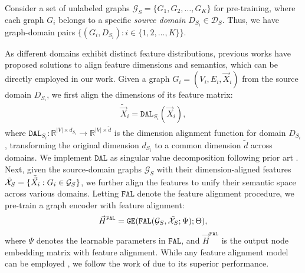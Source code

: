 \label{sec.pre.multi-domain}
Consider a set of unlabeled graphs \( \mathcal{G}_S = \{ G_1, G_2, \ldots, G_K \} \) for pre-training, where each graph \( G_i \) belongs to a specific \emph{source domain} \( D_{S_i} \in \mathcal{D}_S \). 
Thus, we have graph-domain pairs \( \{(G_i, D_{S_i}): i \in \{ 1, 2, \ldots, K\}\} \). 

As different domains exhibit distinct feature distributions, previous works \cite{zhao2024all,yu2024text} have proposed solutions to align feature dimensions and semantics, which can be directly employed in our work. 
Given a graph \( G_{i} = (V_{i}, E_{i}, \vec{X}_{i}) \) from the source domain \( D_{S_i} \), we first align the dimensions of its feature matrix:
\begin{align}\label{eq.pre-train.dim-align}
    \tilde{\Vec{X}}_{i} = \mathtt{DAL}_{S_i}(\Vec{X}_{i}),
\end{align}
where \( \mathtt{DAL}_{S_i} \colon \mathbb{R}^{|V| \times d_{S_i}} \rightarrow \mathbb{R}^{|V| \times \tilde{d}} \) is the dimension alignment function for domain \( D_{S_i} \), transforming the original dimension $d_{S_i}$ to a common dimension $\tilde{d}$ across domains. We implement $\mathtt{DAL}$ as singular value decomposition \cite{stewart1993early} following prior art \cite{zhao2024all,yu2024text}.
Next, given the source-domain graphs $\mathcal{G}_S$ with their dimension-aligned features $\mathcal{\tilde{X}}_S=\{\tilde{\Vec{X}}_{i}: G_{i} \in \mathcal{G}_{S}\}$, we further align the features to unify their semantic space across various domains. Letting $\mathtt{FAL}$ denote the feature alignment procedure, we pre-train a graph encoder with feature alignment:
\begin{align}\label{eq.pre-train.feature-align}
    \Vec{H}^{\mathtt{FAL}} = \mathtt{GE}(\mathtt{FAL}(\mathcal{G}_S,\tilde{\mathcal{X}_S};\Psi);\Theta),
\end{align}
where $\Psi$ denotes the learnable parameters in $\mathtt{FAL}$, and $\Vec{H}^{\mathtt{FAL}}$ is the output node embedding matrix with feature alignment. While any feature alignment model can be employed  \cite{zhao2024all,yu2024text}, we follow the work of \citet{yu2024text} due to its superior performance.


